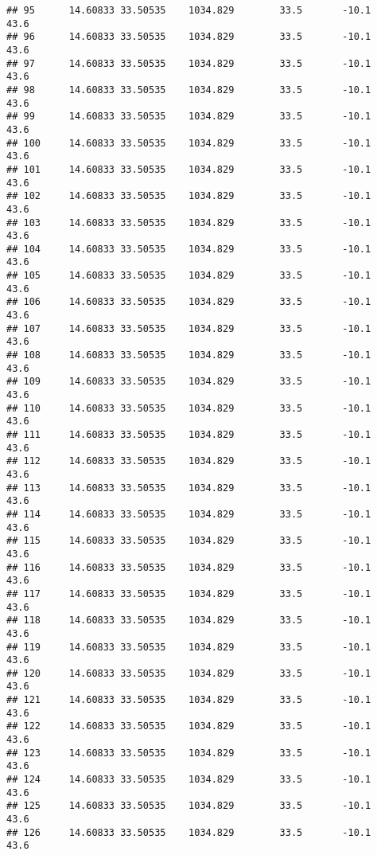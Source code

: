 \documentclass[]{article}
\begin{document}
\begin{verbatim}
## 95      14.60833 33.50535    1034.829        33.5       -10.1              43.6
## 96      14.60833 33.50535    1034.829        33.5       -10.1              43.6
## 97      14.60833 33.50535    1034.829        33.5       -10.1              43.6
## 98      14.60833 33.50535    1034.829        33.5       -10.1              43.6
## 99      14.60833 33.50535    1034.829        33.5       -10.1              43.6
## 100     14.60833 33.50535    1034.829        33.5       -10.1              43.6
## 101     14.60833 33.50535    1034.829        33.5       -10.1              43.6
## 102     14.60833 33.50535    1034.829        33.5       -10.1              43.6
## 103     14.60833 33.50535    1034.829        33.5       -10.1              43.6
## 104     14.60833 33.50535    1034.829        33.5       -10.1              43.6
## 105     14.60833 33.50535    1034.829        33.5       -10.1              43.6
## 106     14.60833 33.50535    1034.829        33.5       -10.1              43.6
## 107     14.60833 33.50535    1034.829        33.5       -10.1              43.6
## 108     14.60833 33.50535    1034.829        33.5       -10.1              43.6
## 109     14.60833 33.50535    1034.829        33.5       -10.1              43.6
## 110     14.60833 33.50535    1034.829        33.5       -10.1              43.6
## 111     14.60833 33.50535    1034.829        33.5       -10.1              43.6
## 112     14.60833 33.50535    1034.829        33.5       -10.1              43.6
## 113     14.60833 33.50535    1034.829        33.5       -10.1              43.6
## 114     14.60833 33.50535    1034.829        33.5       -10.1              43.6
## 115     14.60833 33.50535    1034.829        33.5       -10.1              43.6
## 116     14.60833 33.50535    1034.829        33.5       -10.1              43.6
## 117     14.60833 33.50535    1034.829        33.5       -10.1              43.6
## 118     14.60833 33.50535    1034.829        33.5       -10.1              43.6
## 119     14.60833 33.50535    1034.829        33.5       -10.1              43.6
## 120     14.60833 33.50535    1034.829        33.5       -10.1              43.6
## 121     14.60833 33.50535    1034.829        33.5       -10.1              43.6
## 122     14.60833 33.50535    1034.829        33.5       -10.1              43.6
## 123     14.60833 33.50535    1034.829        33.5       -10.1              43.6
## 124     14.60833 33.50535    1034.829        33.5       -10.1              43.6
## 125     14.60833 33.50535    1034.829        33.5       -10.1              43.6
## 126     14.60833 33.50535    1034.829        33.5       -10.1              43.6

\end{verbatim}
\end{document}
